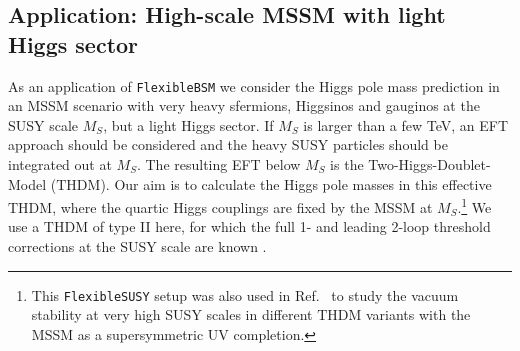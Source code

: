 \documentclass[final,3p,11pt,pdflatex]{elsarticle}
\makeatletter
\newcommand{\fs}{\texttt{FlexibleSUSY}\@\xspace}
\newcommand{\fbsm}{\texttt{FlexibleBSM}\@\xspace}
\newcommand{\THDM}{\ensuremath{\text{THDM}}\xspace}
\newcommand{\MS}{\ensuremath{M_S}\xspace}
\makeatother
\begin{document}
\subsection{Application: High-scale MSSM with light Higgs sector}
\label{sec:application_THDM}

As an application of \fbsm we consider the Higgs pole mass prediction
in an MSSM scenario with very heavy sfermions, Higgsinos and gauginos
at the SUSY scale $\MS$, but a light Higgs sector.  If $\MS$ is larger
than a few TeV, an EFT approach should be considered and the heavy SUSY
particles should be integrated out at $\MS$.  The resulting EFT below $\MS$ is
the Two-Higgs-Doublet-Model (\THDM).  Our aim is to calculate the Higgs pole
masses in this effective \THDM, where the quartic Higgs couplings are fixed by the
MSSM at $\MS$.\footnote{This \fs setup was also used in
  Ref.~\cite{Bagnaschi:2015pwa} to study the vacuum stability at very
  high SUSY scales in different \THDM variants with the MSSM as a
  supersymmetric UV completion.}  We use a \THDM of type II here, for
which the full 1- and leading 2-loop threshold corrections at the SUSY
scale are known \cite{Haber:1993an,Gorbahn:2009pp,Lee:2015uza}.
\end{document}
